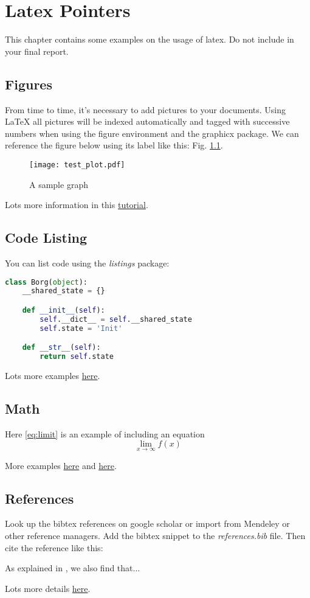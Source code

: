 \chapter{Latex Pointers}

This chapter contains some examples on the usage of latex. Do not include in your final report.

\section{Figures}
From time to time, it's necessary to add pictures to your documents. Using LaTeX all pictures will be indexed automatically and tagged with successive numbers when using the figure environment and the graphicx package. We can reference the figure below using its label like this: Fig. \ref{fig:test_plot}.
\begin{figure}[h]
    \centering
  \texttt{[image: test\_plot.pdf]}
  \caption{A sample graph}
  \label{fig:test_plot}
\end{figure}

Lots more information in this \href{https://www.latex-tutorial.com/tutorials/figures/}{tutorial}.


\section{Code Listing}
You can list code using the \emph{listings} package:

\begin{lstlisting}[language=Python,caption=Borg Pattern]
class Borg(object):
    __shared_state = {}

    def __init__(self):
        self.__dict__ = self.__shared_state
        self.state = 'Init'

    def __str__(self):
        return self.state
\end{lstlisting}

Lots more examples \href{https://www.overleaf.com/learn/latex/Code_listing}{here}.

\section{Math}
Here \ref{eq:limit} is an example of including an equation
\begin{equation}
\lim_{x\to\infty} f(x)
\label{eq:limit}
\end{equation}

More examples \href{https://www.latex-tutorial.com/tutorials/amsmath/}{here} and \href{https://www.overleaf.com/learn/latex/Mathematical_expressions}{here}.



\section{References}
Look up the bibtex references on google scholar or import from Mendeley or other reference managers. Add the bibtex snippet to the \emph{references.bib} file. Then cite the reference like this:

As explained in \cite{knuth2014art}, we also find that...

Lots more details \href{https://www.latex-tutorial.com/tutorials/bibtex/}{here}.

